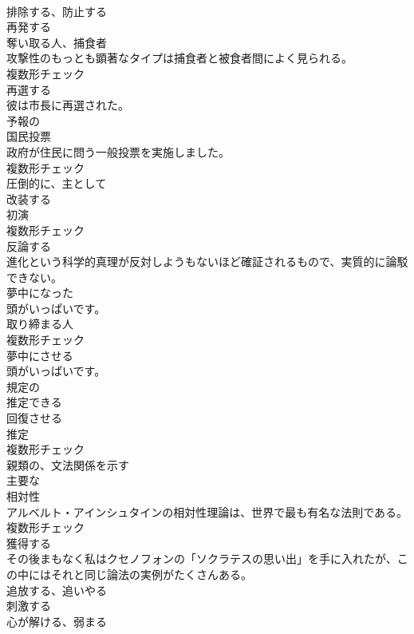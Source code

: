 \documentclass[8pt]{extreport}
\begin{document}
\begin{CJK}{UTF8}{min}
\\	[動詞]	排除する、防止する	
\\	[形容詞]	再発する	
\\	[名詞]	奪い取る人、捕食者	
\\	攻撃性のもっとも顕著なタイプは捕食者と被食者間によく見られる。	
\\	複数形チェック
\\	[動詞]	再選する	
\\	彼は市長に再選された。	
\\	[形容詞]	予報の	
\\	[名詞]	国⺠投票	
\\	政府が住民に問う一般投票を実施しました。	
\\	複数形チェック
\\	[形容詞]	圧倒的に、主として	
\\	[動詞]	改装する	
\\	[名詞]	初演	
\\	複数形チェック
\\	[動詞]	反論する	
\\	進化という科学的真理が反対しようもないほど確証されるもので、実質的に論駁できない。	
\\	[形容詞]	夢中になった	
\\	頭がいっぱいです。	
\\	[名詞]	取り締まる人	
\\	複数形チェック
\\	[動詞]	夢中にさせる	
\\	頭がいっぱいです。	
\\	[形容詞]	規定の	
\\	[形容詞]	推定できる	
\\	[動詞]	回復させる	
\\	[名詞]	推定	
\\	複数形チェック
\\	[形容詞]	親類の、文法関係を示す	
\\	[形容詞]	主要な	
\\	[名詞]	相対性	
\\	アルベルト・アインシュタインの相対性理論は、世界で最も有名な法則である。	
\\	複数形チェック
\\	[動詞]	獲得する	
\\	その後まもなく私はクセノフォンの「ソクラテスの思い出」を手に入れたが、この中にはそれと同じ論法の実例がたくさんある。	
\\	[動詞]	追放する、追いやる	
\\	[動詞]	刺激する	
\\	[動詞]	心が解ける、弱まる	

\end{CJK}
\end{document}
